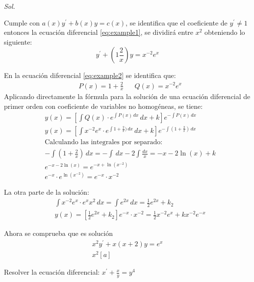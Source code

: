 \textit{ Sol. }

Cumple con $a(x)y^{\prime}+b(x)y=c(x)$, se identifica que el coeficiente de $y^{\prime}\neq 1$
entonces la ecuación diferencial \eqref{eq:example1}, se dividirá entre $x^2$ obteniendo lo siguiente: 
\begin{equation}
    y^{\prime}+\left(1\frac{2}{x}\right)y=x^{-2}e^x
    \label{eq:example2}
\end{equation}

En la ecuación diferencial \eqref{eq:example2} se identifica que: 
\begin{align*}
    &P(x)=1+\frac{2}{x}&&Q(x)=x^{-2}e^x
\end{align*}
Aplicando directamente la fórmula para la solución de una ecuación diferencial de primer orden con coeficiente de variables no homogéneas, se tiene:
\begin{align*}
    &y(x)=\left[\int Q(x)\cdot e^{\int P(x)\, dx}\, dx+k \right]e^{-\int P(x)\, dx}\\
    &y(x)=\left[\int x^{-2}e^x\cdot e^{\int
    1+\frac{2}{x})\, dx}\, dx+k  \right]e^{-\int \left(1+\frac{2}{x}\right)\, dx}\\
    &\text{Calculando las integrales por separado:}\\
    &-\int \left(1+\frac{2}{x}\right)\, dx=-\int \, dx-2\int\frac{dx}{x}=-x-2\ln{(x)}+k\\
    &e^{-x-2\ln{(x)}}=e^{-x+\ln{(x^{-2})}}\\
    &e^{-x}\cdot e^{\ln{(x^{-2})}}=e^{-x}\cdot x^{-2}
\end{align*}

La otra parte de la solución: 
\begin{align*}
    &\int x^{-2}e^x\cdot e^xx^2\, dx=\int e^{2x}\,dx=\frac{1}{2}e^{2x}+k_2\\
    &y(x)=\left[\frac{1}{2}e^{2x}+k_2 \right]e^{-x}\cdot x^{-2}=\frac{1}{2}x^{-2}e^{x}+kx^{-2}e^{-x}
\end{align*}

Ahora se comprueba que es solución 
\begin{align*}
    x^2y^{\prime}+x(x+2)y=e^x\\
    x^2\left[a\right]
\end{align*}


\begin{example}
    Resolver la ecuación diferencial: $x^{\prime}+\frac{x}{y}=y^4$
\end{example}


